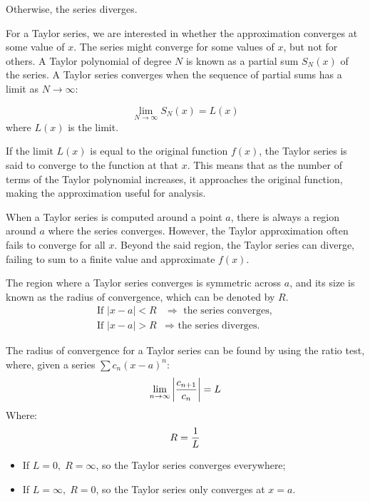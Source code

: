\documentclass[a4paper, 12pt]{article}
\begin{document}
Otherwise, the series diverges. 

For a Taylor series, we are interested in whether the approximation converges at some value of $x$. The series might converge for some values of $x$, but not for others. A Taylor polynomial of degree $N$ is known as a partial sum $S_N(x)$ of the series. A Taylor series converges when the sequence of partial sums has a limit as $N\to\infty$:

\begin{equation}
    \lim_{N\to\infty} S_N(x)=L(x)
\end{equation}
where $L(x)$ is the limit.

If the limit $L(x)$ is equal to the original function $f(x)$, the Taylor series is said to converge to the function at that $x$. This means that as the number of terms of the Taylor polynomial increases, it approaches the original function, making the approximation useful for analysis. 

When a Taylor series is computed around a point $a$, there is always a region around $a$ where the series converges. However, the Taylor approximation often fails to converge for all $x$. Beyond the said region, the Taylor series can diverge, failing to sum to a finite value and approximate $f(x)$.

The region where a Taylor series converges is symmetric across $a$, and its size is known as the radius of convergence, which can be denoted by $R$.
\begin{equation}
\begin{aligned}
\text{If } |x - a| < R &\Rightarrow \text{ the series converges},\\
\text{If } |x - a| > R &\Rightarrow \text{ the series diverges.}
\end{aligned}
\end{equation}

The radius of convergence for a Taylor series can be found by using the ratio test, where, given a series $\sum c_n(x-a)^n$:
\begin{equation}
    \lim_{n\to\infty}\left| {c_{n+1}\over{c_n}}\right|=L
\end{equation}
Where:
\begin{equation}
    R={1\over L}
\end{equation}
\begin{itemize}
    \item If $L=0,\;R=\infty$, so the Taylor series converges everywhere;
    \item If $L=\infty,\; R=0$, so the Taylor series only converges at $x=a$.
\end{itemize}
\end{document}
